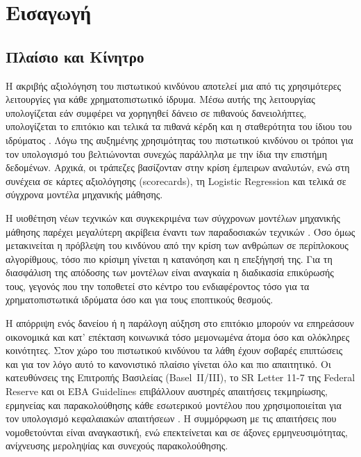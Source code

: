 \chapter{Εισαγωγή}
\label{ch:intro}

\section{Πλαίσιο και Κίνητρο}
\label{sec:motivation}

Η ακριβής αξιολόγηση του πιστωτικού κινδύνου αποτελεί μια από τις χρησιμότερες
λειτουργίες για κάθε χρηματοπιστωτικό ίδρυμα. Μέσω αυτής της λειτουργίας
υπολογίζεται εάν συμφέρει να χορηγηθεί δάνειο σε πιθανούς δανειολήπτες,
υπολογίζεται το επιτόκιο και τελικά τα πιθανά κέρδη και η σταθερότητα του
ίδιου του ιδρύματος \citep{basel2006}. Λόγω της αυξημένης χρησιμότητας του
πιστωτικού κινδύνου οι τρόποι για τον υπολογισμό του βελτιώνονται συνεχώς
παράλληλα με την ίδια την επιστήμη δεδομένων. Αρχικά, οι τράπεζες βασίζονταν
στην κρίση έμπειρων αναλυτών, ενώ στη συνέχεια σε κάρτες αξιολόγησης
(scorecards), τη Logistic Regression και τελικά σε σύγχρονα μοντέλα μηχανικής
μάθησης.

Η υιοθέτηση νέων τεχνικών και συγκεκριμένα των σύγχρονων μοντέλων μηχανικής
μάθησης παρέχει μεγαλύτερη ακρίβεια έναντι των παραδοσιακών
τεχνικών \citep{hastie2009}. Όσο όμως μετακινείται η πρόβλεψη του κινδύνου
από την κρίση των ανθρώπων σε περίπλοκους αλγορίθμους, τόσο πιο κρίσιμη
γίνεται η κατανόηση και η επεξήγησή της. Για τη διασφάλιση της απόδοσης των
μοντέλων είναι αναγκαία η διαδικασία επικύρωσής τους, γεγονός που την
τοποθετεί στο κέντρο του ενδιαφέροντος τόσο για τα χρηματοπιστωτικά ιδρύματα
όσο και για τους εποπτικούς θεσμούς.

Η απόρριψη ενός δανείου ή η παράλογη αύξηση στο επιτόκιο μπορούν να
επηρεάσουν οικονομικά και κατ' επέκταση κοινωνικά τόσο μεμονωμένα άτομα
όσο και ολόκληρες κοινότητες. Στον χώρο του πιστωτικού κινδύνου τα λάθη
έχουν σοβαρές επιπτώσεις και για τον λόγο αυτό το κανονιστικό πλαίσιο γίνεται
όλο και πιο απαιτητικό. Οι κατευθύνσεις της Επιτροπής Βασιλείας (Basel~II/III),
το SR Letter 11-7 της Federal Reserve και οι EBA Guidelines επιβάλλουν αυστηρές
απαιτήσεις τεκμηρίωσης, ερμηνείας και παρακολούθησης κάθε εσωτερικού μοντέλου
που χρησιμοποιείται για τον υπολογισμό κεφαλαιακών
απαιτήσεων \citep{basel2017, sr117, eba2023}. Η συμμόρφωση με τις απαιτήσεις
που νομοθετούνται είναι αναγκαστική, ενώ επεκτείνεται και σε άξονες
ερμηνευσιμότητας, ανίχνευσης μεροληψίας και συνεχούς παρακολούθησης.

